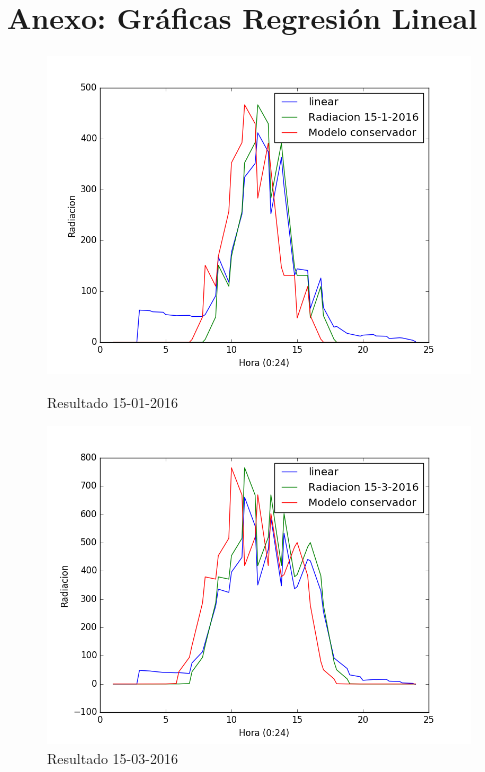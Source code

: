\cleardoublepage

\chapter{Anexo: Gráficas Regresión Lineal}
\label{Appendix:Key1}

\begin{figure}[htb]
		\includegraphics[width=\linewidth]{figures/linear_2016011520160115.png}
		\caption{Resultado 15-01-2016 \label{resultado_linear_1}}
\endminipage\hfill
{}
		\includegraphics[width=\linewidth]{figures/linear_2016031520160315.png}
		\caption{Resultado 15-03-2016 \label{resultado_linear_2}}
\endminipage\hfill
\end{figure}

